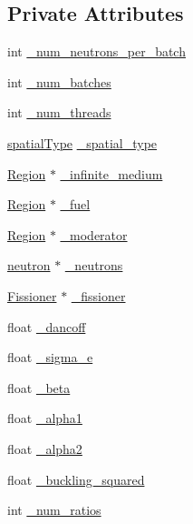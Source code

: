 \subsection*{Private Attributes}
\begin{DoxyCompactItemize}
\item 
int \hyperlink{classGeometry_ab2f62b285fd3ebc06114db10a3f50167}{\-\_\-num\-\_\-neutrons\-\_\-per\-\_\-batch}
\item 
int \hyperlink{classGeometry_a600fda86b7f3951331ae486548306407}{\-\_\-num\-\_\-batches}
\item 
int \hyperlink{classGeometry_af78593ff6416ad7fc318e4b8692ed77e}{\-\_\-num\-\_\-threads}
\item 
\hyperlink{Geometry_8h_af321382c4a8d9fdb71c83382f82fac00}{spatial\-Type} \hyperlink{classGeometry_a2e9b473e54caa2c7742b4f676bedf91e}{\-\_\-spatial\-\_\-type}
\item 
\hyperlink{classRegion}{Region} $\ast$ \hyperlink{classGeometry_aad96c277327aa2fb1f512f4678af94f0}{\-\_\-infinite\-\_\-medium}
\item 
\hyperlink{classRegion}{Region} $\ast$ \hyperlink{classGeometry_afca54e88b6d937055fc9ca124db1e17e}{\-\_\-fuel}
\item 
\hyperlink{classRegion}{Region} $\ast$ \hyperlink{classGeometry_a023855a68edb163698d88da928935c4b}{\-\_\-moderator}
\item 
\hyperlink{structneutron}{neutron} $\ast$ \hyperlink{classGeometry_aae2651151b89d9b82c434eaa83edc477}{\-\_\-neutrons}
\item 
\hyperlink{classFissioner}{Fissioner} $\ast$ \hyperlink{classGeometry_a5947cd1c6029329ed188ce4b8a8d4e28}{\-\_\-fissioner}
\item 
float \hyperlink{classGeometry_aedfa5e190e5e87f0a0d84ca48278e019}{\-\_\-dancoff}
\item 
float \hyperlink{classGeometry_a161dd81342c2018dc6af5db732385b67}{\-\_\-sigma\-\_\-e}
\item 
float \hyperlink{classGeometry_a20733d493193d7c75ad9afb454046324}{\-\_\-beta}
\item 
float \hyperlink{classGeometry_a29007358759f00d89a8544539bfb7b75}{\-\_\-alpha1}
\item 
float \hyperlink{classGeometry_a36642c1914426a3bdbcb291497e2c7f8}{\-\_\-alpha2}
\item 
float \hyperlink{classGeometry_aa4c62b0931b1a51effdec42a28e9088f}{\-\_\-buckling\-\_\-squared}
\item 
int \hyperlink{classGeometry_a67baa59c9ac0e8819e5844bcef85442d}{\-\_\-num\-\_\-ratios}

\end{DoxyCompactItemize}
